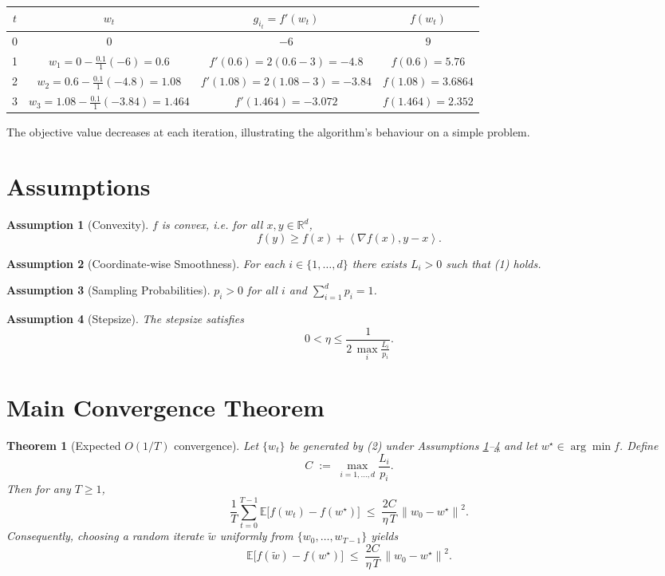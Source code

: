 \documentclass{article}
\newtheorem{theorem}{Theorem}
\newtheorem{assumption}{Assumption}
\newcommand{\E}{\mathbb{E}}
\newcommand{\norm}[1]{\left\|#1\right\|}
\newcommand{\ip}[2]{\left\langle #1,#2\right\rangle}
\begin{document}
\begin{center}
\begin{tabular}{c|c|c|c}
$t$ & $w_t$ & $g_{i_t}=f'(w_t)$ & $f(w_t)$\\\hline
0 & $0$ & $-6$ & $9$\\
1 & $w_1=0-\frac{0.1}{1}(-6)=0.6$ & $f'(0.6)=2(0.6-3)=-4.8$ & $f(0.6)=5.76$\\
2 & $w_2=0.6-\frac{0.1}{1}(-4.8)=1.08$ & $f'(1.08)=2(1.08-3)=-3.84$ & $f(1.08)=3.6864$\\
3 & $w_3=1.08-\frac{0.1}{1}(-3.84)=1.464$ & $f'(1.464)=-3.072$ & $f(1.464)=2.352$\\
\end{tabular}
\end{center}
The objective value decreases at each iteration, illustrating the algorithm’s behaviour on a simple problem.

\section*{Assumptions}
\begin{assumption}[Convexity]\label{ass:convex}
$f$ is convex, i.e. for all $x,y\in\mathbb{R}^d$,
\[
f(y)\ge f(x)+\ip{\nabla f(x)}{y-x}.
\tag{3}
\]
\end{assumption}
\begin{assumption}[Coordinate‑wise Smoothness]\label{ass:smooth}
For each $i\in\{1,\dots,d\}$ there exists $L_i>0$ such that (1) holds.
\end{assumption}
\begin{assumption}[Sampling Probabilities]\label{ass:prob}
$p_i>0$ for all $i$ and $\sum_{i=1}^d p_i =1$.
\end{assumption}
\begin{assumption}[Stepsize]\label{ass:step}
The stepsize satisfies
\[
0<\eta\le \frac{1}{2\,\max_{i}\frac{L_i}{p_i}}.
\tag{4}
\]
\end{assumption}

\section*{Main Convergence Theorem}
\begin{theorem}[Expected $O(1/T)$ convergence]\label{thm:main}
Let $\{w_t\}$ be generated by (2) under Assumptions \ref{ass:convex}–\ref{ass:step} and let $w^\star\in\arg\min f$. Define
\[
C\;:=\;\max_{i=1,\dots,d}\frac{L_i}{p_i}.
\]
Then for any $T\ge 1$,
\[
\frac{1}{T}\sum_{t=0}^{T-1}\E\!\bigl[f(w_t)-f(w^\star)\bigr]
\;\le\;
\frac{2C}{\eta\,T}\,\norm{w_0-w^\star}^{2}.
\tag{5}
\]
Consequently, choosing a random iterate $\tilde w$ uniformly from $\{w_0,\dots,w_{T-1}\}$ yields
\[
\E\!\bigl[f(\tilde w)-f(w^\star)\bigr]\;\le\;\frac{2C}{\eta\,T}\,\norm{w_0-w^\star}^{2}.
\]
\end{theorem}
\end{document}
